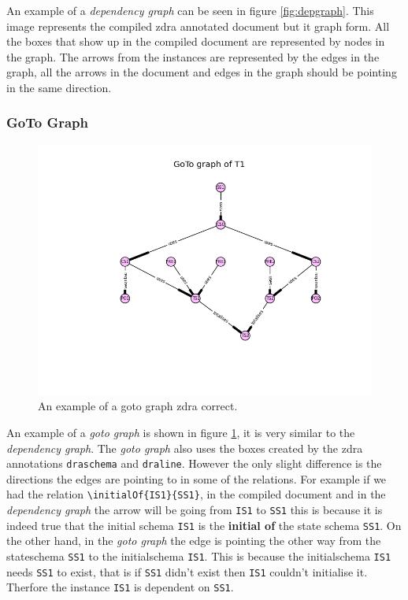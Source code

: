 An example of a \emph{dependency graph} can be seen in figure
\ref{fig:depgraph}. This image represents the compiled \gls{zdra} annotated
document but it graph form. All the boxes that show up in the compiled document
are represented by nodes in the graph. The arrows from the instances are
represented by the edges in the graph, all the arrows in the document and edges
in the graph should be pointing in the same direction.


\subsubsection{GoTo Graph}

\begin{figure}[H]
\centering
\includegraphics[scale=0.6]{Figures/zdra/gotograph.png}
\caption{An example of a goto graph \gls{zdra} correct. \label{fig:gotograph}}
\end{figure}

An example of a \emph{goto graph} is shown in figure \ref{fig:gotograph}, it is
very similar to the \emph{dependency graph}. The \emph{goto graph} also uses the
boxes created by the \gls{zdra} annotations \verb|draschema| and \verb|draline|.
However the only slight difference is the directions the edges are pointing to
in some of the relations. For example if we had the relation
\verb|\initialOf{IS1}{SS1}|, in the compiled document and in the
\emph{dependency graph} the arrow will be going from \verb|IS1| to \verb|SS1|
this is because it is indeed true that the initial schema \verb|IS1| is the
\textbf{initial of} the state schema \verb|SS1|. On the other hand, in the
\emph{goto graph} the edge is pointing the other way from the stateschema
\verb|SS1| to the initialschema \verb|IS1|. This is because the initialschema
\verb|IS1| needs \verb|SS1| to exist, that is if \verb|SS1| didn't exist then
\verb|IS1| couldn't initialise it. Therfore the instance \verb|IS1| is dependent
on \verb|SS1|.

